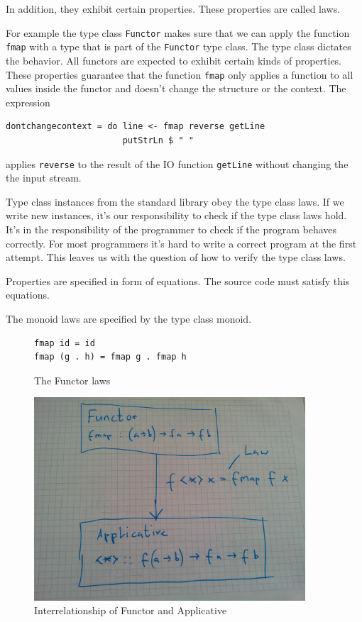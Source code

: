  In addition, they exhibit certain properties. These properties are called laws. 


For example the type class \verb|Functor| makes sure that we can apply the function \verb|fmap| with a type that is part of the \verb|Functor| type class. The type class dictates the behavior. All functors are expected to exhibit certain kinds of properties. These properties guarantee that the function \verb|fmap| only applies a function to all values inside the functor and doesn't change the structure or the context. The expression
\begin{verbatim}
dontchangecontext = do line <- fmap reverse getLine
                       putStrLn $ " "
\end{verbatim}
applies \verb|reverse| to the result of the IO function \verb|getLine| without changing the the input stream. 

Type class instances from the standard library obey the type class laws. If we write new instances, it's our responsibility to check if the type class laws hold.
It's in the responsibility of the programmer to check if the program behaves correctly. For most programmers it's hard to write a correct program at the first attempt. This leaves us with the question of how to verify the type class laws. 

Properties are specified in form of equations. The source code must satisfy this equations. 


The monoid laws are specified by the type class monoid.


\begin{figure}
  \centering
\begin{verbatim}
fmap id = id
fmap (g . h) = fmap g . fmap h
\end{verbatim}
  \caption{The Functor laws}
  \label{fig:functorlaws}
\end{figure}

\begin{figure}
  \centering
     \includegraphics[width=0.9\textwidth]{functor_applicative}
  \caption{Interrelationship of Functor and Applicative }
  \label{fig:functor_applicative}
\end{figure}



